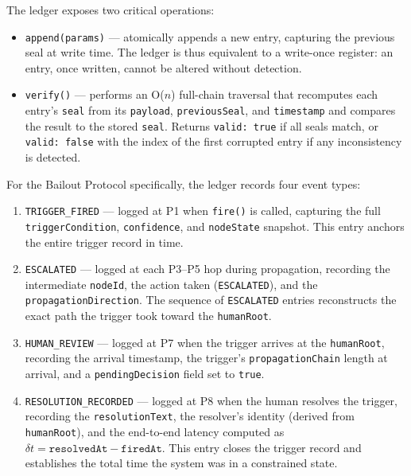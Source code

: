 The ledger exposes two critical operations:

\begin{itemize}
  \item \texttt{append(params)} — atomically appends a new entry, capturing the
        previous seal at write time.  The ledger is thus equivalent to a
        write-once register: an entry, once written, cannot be altered without
        detection.
  \item \texttt{verify()} — performs an O($n$) full-chain traversal that recomputes
        each entry's \texttt{seal} from its \texttt{payload}, \texttt{previousSeal},
        and \texttt{timestamp} and compares the result to the stored \texttt{seal}.
        Returns \texttt{valid: true} if all seals match, or \texttt{valid: false}
        with the index of the first corrupted entry if any inconsistency is detected.
\end{itemize}

For the Bailout Protocol specifically, the ledger records four event types:

\begin{enumerate}
  \item \texttt{TRIGGER\_FIRED} — logged at P1 when \texttt{fire()} is called,
        capturing the full \texttt{triggerCondition}, \texttt{confidence}, and
        \texttt{nodeState} snapshot.  This entry anchors the entire trigger record
        in time.

  \item \texttt{ESCALATED} — logged at each P3–P5 hop during propagation, recording
        the intermediate \texttt{nodeId}, the action taken (\texttt{ESCALATED}), and
        the \texttt{propagationDirection}.  The sequence of \texttt{ESCALATED} entries
        reconstructs the exact path the trigger took toward the \texttt{humanRoot}.

  \item \texttt{HUMAN\_REVIEW} — logged at P7 when the trigger arrives at the
        \texttt{humanRoot}, recording the arrival timestamp, the trigger's
        \texttt{propagationChain} length at arrival, and a \texttt{pendingDecision}
        field set to \texttt{true}.

  \item \texttt{RESOLUTION\_RECORDED} — logged at P8 when the human resolves the
        trigger, recording the \texttt{resolutionText}, the resolver's identity
        (derived from \texttt{humanRoot}), and the end-to-end latency computed as
        $\delta t = \texttt{resolvedAt} - \texttt{firedAt}$.  This entry closes the
        trigger record and establishes the total time the system was in a
        constrained state.
\end{enumerate}

